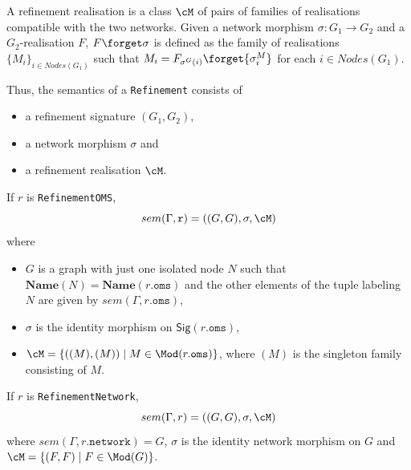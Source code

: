 \documentclass[10pt, a4paper]{isov2}
\newcommand*{\syntax}[1]{\texttt{#1}}
\newcommand{\Sig}{\mathsf{Sig}}
\newcommand{\Name}{\ensuremath{\mathbf{Name}}}
\begin{document}
A refinement realisation is a class $\cM$ 
of pairs of families of realisations compatible with the two networks. 
Given a network morphism $\sigma:G_1\to G_2$ and a $G_2$-realisation $F$, 
 $F\forget\sigma$ is defined as the family of realisations 
$\{M_i\}_{i\in Nodes(G_1)}$ such that
$M_i = F_{\sigma^G(i)}\forget{\sigma^M_{i}}$ for each $i\in Nodes(G_1)$.

Thus, the semantics of a \syntax{Refinement} consists of
\begin{itemize}
 \item a refinement signature $(G_1,G_2)$,
 \item a network morphism $\sigma$ and
 \item a refinement realisation $\cM$.
\end{itemize}
\medskip

If $r$ is \syntax{RefinementOMS},
$$sem(\Gamma, \syntax{r}) = 
   ((G, G), \sigma, \cM) $$
  \noindent where 
  \begin{itemize}
  \item $G$ is a graph with just one isolated node $N$
  such that $\Name(N) = \Name(r.\syntax{oms})$
  and the other elements of the tuple labeling
  $N$ are given by $sem(\Gamma,r.\syntax{oms})$,
  \item $\sigma$ is the identity morphism on 
  $\Sig(r.\syntax{oms})$,  
  \item $\cM = \{((M), (M)) \mid M \in \Mod(r.\syntax{oms})\}$,
   where $(M)$ is the singleton family consisting of $M$.
  \end{itemize}

If $r$ is \syntax{RefinementNetwork},
$$sem(\Gamma, r) = ((G, G), \sigma, \cM)$$
\noindent 
where $sem(\Gamma, r.\syntax{network}) = G$,
$\sigma$ is the identity network morphism on $G$
and 
$\cM = \{ (F, F) \mid F \in \Mod(G)\}$.
\end{document}
